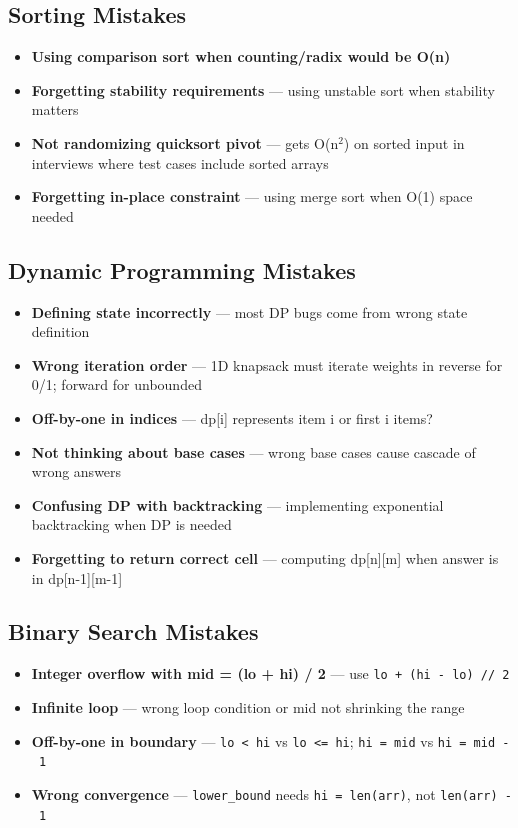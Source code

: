 \documentclass[11pt]{article}
\providecommand{\tightlist}{\setlength{\itemsep}{1pt}\setlength{\parskip}{0pt}}
\begin{document}
\subsection{Sorting Mistakes}\label{sorting-mistakes}

\begin{itemize}
\tightlist
\item
  \textbf{Using comparison sort when counting/radix would be O(n)}
\item
  \textbf{Forgetting stability requirements} --- using unstable sort when stability matters
\item
  \textbf{Not randomizing quicksort pivot} --- gets O(n\(^2\)) on sorted input in interviews where test cases include sorted arrays
\item
  \textbf{Forgetting in-place constraint} --- using merge sort when O(1) space needed
\end{itemize}

\subsection{Dynamic Programming Mistakes}\label{dynamic-programming-mistakes}

\begin{itemize}
\tightlist
\item
  \textbf{Defining state incorrectly} --- most DP bugs come from wrong state definition
\item
  \textbf{Wrong iteration order} --- 1D knapsack must iterate weights in reverse for 0/1; forward for unbounded
\item
  \textbf{Off-by-one in indices} --- dp{[}i{]} represents item i or first i items?
\item
  \textbf{Not thinking about base cases} --- wrong base cases cause cascade of wrong answers
\item
  \textbf{Confusing DP with backtracking} --- implementing exponential backtracking when DP is needed
\item
  \textbf{Forgetting to return correct cell} --- computing dp{[}n{]}{[}m{]} when answer is in dp{[}n-1{]}{[}m-1{]}
\end{itemize}

\subsection{Binary Search Mistakes}\label{binary-search-mistakes}

\begin{itemize}
\tightlist
\item
  \textbf{Integer overflow with mid = (lo + hi) / 2} --- use \texttt{lo\ +\ (hi\ -\ lo)\ //\ 2}
\item
  \textbf{Infinite loop} --- wrong loop condition or mid not shrinking the range
\item
  \textbf{Off-by-one in boundary} --- \texttt{lo\ \textless{}\ hi} vs \texttt{lo\ \textless{}=\ hi}; \texttt{hi\ =\ mid} vs \texttt{hi\ =\ mid\ -\ 1}
\item
  \textbf{Wrong convergence} --- \texttt{lower\_bound} needs \texttt{hi\ =\ len(arr)}, not \texttt{len(arr)\ -\ 1}
\end{itemize}
\end{document}
